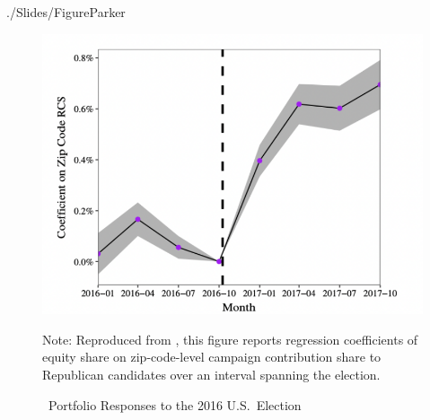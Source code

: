 

\begin{verbatimwrite}{./Slides/FigureParker}
  \begin{figure}[!ht] \centering  %
    \caption{ ~Portfolio Responses to the 2016 U.S.\ Election}
    \label{fig:parker}
    \centerline{\includegraphics[width=\textwidth]{./figures/parker}}
    \begin{flushleft}
      {\footnotesize Note: Reproduced from \cite{meeuwis2018belief}, this figure reports regression coefficients of equity share on zip-code-level campaign contribution share to Republican candidates over an interval spanning the election.}
    \end{flushleft}
  \end{figure}
\end{verbatimwrite}





